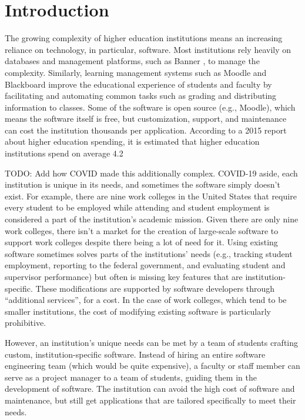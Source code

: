 \section{Introduction}

The growing complexity of higher education institutions means an increasing reliance on technology, in particular, software. Most institutions rely heavily on databases and management platforms, such as Banner \cite{BannerWebsite}, to manage the complexity. Similarly, learning management systems such as Moodle \cite{MoodleWebsite} and Blackboard \cite{BlackboardWebsite} improve the educational experience of students and faculty by facilitating and automating common tasks such as grading and distributing information to classes. Some of the software is open source (e.g., Moodle), which means the software itself is free, but customization, support, and maintenance can cost the institution thousands per application. According to a 2015 report about higher education spending, it is estimated that higher education institutions spend on average 4.2%

TODO: Add how COVID made this additionally complex.
COVID-19 aside, each institution is unique in its needs, and sometimes the software simply doesn't exist. For example, there are nine work colleges in the United States \cite{WCCMembers, Ecclesia} that require every student to be employed while attending and student employment is considered a part of the institution's academic mission. Given there are only nine work colleges, there isn't a market for the creation of large-scale software to support work colleges despite there being a lot of need for it. Using existing software sometimes solves parts of the institutions’ needs (e.g., tracking student employment, reporting to the federal government, and evaluating student and supervisor performance) but often is missing key features that are institution-specific. These modifications are supported by software developers through “additional services”, for a cost. In the case of work colleges, which tend to be smaller institutions, the cost of modifying existing software is particularly prohibitive.

However, an institution's unique needs can be met by a team of students crafting custom, institution-specific software. Instead of hiring an entire software engineering team (which would be quite expensive), a faculty or staff member can serve as a project manager to a team of students, guiding them in the development of software. The institution can avoid the high cost of software and maintenance, but still get applications that are tailored specifically to meet their needs.

